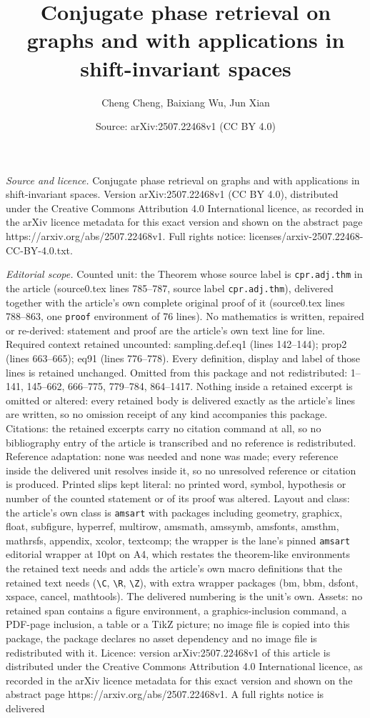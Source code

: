 \documentclass[10pt,a4paper]{amsart}
\title[Conjugate phase retrieval on graphs and with applications in]{Conjugate phase retrieval on graphs and with applications in shift-invariant spaces}
\author{Cheng Cheng, Baixiang Wu, Jun Xian}
\date{Source: arXiv:2507.22468v1 (CC BY 4.0)}
\begin{document}
\maketitle

\noindent\emph{Source and licence.} Conjugate phase retrieval on graphs and with applications in shift-invariant spaces. Version arXiv:2507.22468v1 (CC BY 4.0), distributed under the Creative Commons Attribution 4.0 International licence, as recorded in the arXiv licence metadata for this exact version and shown on the abstract page https://arxiv.org/abs/2507.22468v1. Full rights notice: licenses/arxiv-2507.22468-CC-BY-4.0.txt.\par\smallskip

\noindent\textit{Editorial scope.} Counted unit: the Theorem whose source label is \texttt{cpr.adj.thm} in the article (source0.tex lines 785--787, source label \texttt{cpr.adj.thm}), delivered together with the article's own complete original proof of it (source0.tex lines 788--863, one \texttt{proof} environment of 76 lines). No mathematics is written, repaired or re-derived: statement and proof are the article's own text line for line. Required context retained uncounted: sampling.def.eq1 (lines 142--144); prop2 (lines 663--665); eq91 (lines 776--778). Every definition, display and label of those lines is retained unchanged. Omitted from this package and not redistributed: 1--141, 145--662, 666--775, 779--784, 864--1417. Nothing inside a retained excerpt is omitted or altered: every retained body is delivered exactly as the article's lines are written, so no omission receipt of any kind accompanies this package. Citations: the retained excerpts carry no citation command at all, so no bibliography entry of the article is transcribed and no reference is redistributed. Reference adaptation: none was needed and none was made; every reference inside the delivered unit resolves inside it, so no unresolved reference or citation is produced. Printed slips kept literal: no printed word, symbol, hypothesis or number of the counted statement or of its proof was altered. Layout and class: the article's own class is \texttt{amsart} with packages including geometry, graphicx, float, subfigure, hyperref, multirow, amsmath, amssymb, amsfonts, amsthm, mathrsfs, appendix, xcolor, textcomp; the wrapper is the lane's pinned \texttt{amsart} editorial wrapper at 10pt on A4, which restates the theorem-like environments the retained text needs and adds the article's own macro definitions that the retained text needs (\texttt{\textbackslash C}, \texttt{\textbackslash R}, \texttt{\textbackslash Z}), with extra wrapper packages (bm, bbm, dsfont, xspace, cancel, mathtools). The delivered numbering is the unit's own. Assets: no retained span contains a figure environment, a graphics-inclusion command, a PDF-page inclusion, a table or a TikZ picture; no image file is copied into this package, the package declares no asset dependency and no image file is redistributed with it. Licence: version arXiv:2507.22468v1 of this article is distributed under the Creative Commons Attribution 4.0 International licence, as recorded in the arXiv licence metadata for this exact version and shown on the abstract page https://arxiv.org/abs/2507.22468v1. A full rights notice is delivered 
\end{document}
